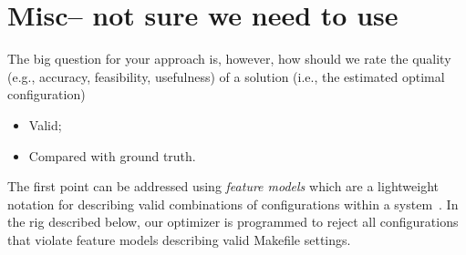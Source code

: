 \documentclass{sig-alternative}
\newcommand{\bi}{\begin{itemize}}%
\newcommand{\ei}{\end{itemize}}
\begin{document}

 \section{Misc-- not sure we need to use}
 
 The big question for your approach is, however, how should we rate the quality (e.g., accuracy, feasibility, usefulness) of a solution (i.e., the estimated optimal configuration) 
\bi
\item Valid;
\item Compared with ground truth.
\ei
The first point can be addressed using {\em feature models} which are a lightweight notation
for describing valid combinations of configurations within a  system~\cite{kang1990feature}. In the rig
described below, our optimizer is programmed to reject all configurations that violate
feature models describing valid Makefile settings.
\end{document}
